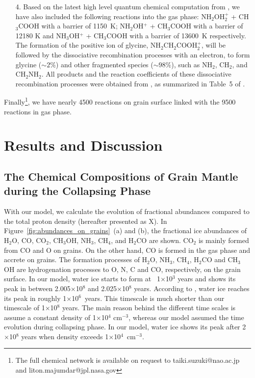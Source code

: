 \documentclass{aastex61}
\begin{document}
\begin{itemize}
\item [4.] Based on the latest high level quantum chemical computation from \cite{Barrientos12}, we have also included the following reactions into the gas phase: NH$_2$OH$_2^+$ + CH$_3$COOH with a barrier of 1150~K; NH$_2$OH$^+$ + CH$_3$COOH with a barrier of 12180 K and NH$_3$OH$^+$ + CH$_3$COOH with a barrier of 13600~K respectively.  
%
The formation of the positive ion of glycine, NH$_2$CH$_2$COOH$_2^+$, will be followed by the dissociative recombination processes with an electron, to form glycine ($\sim2\%$) and other fragmented species ($\sim98\%$), such as NH$_2$, CH$_2$, and CH$_2$NH$_2$.
%
All products and the reaction coefficients of these dissociative recombination processes were obtained from \cite{Garrod13}, as summarized in Table~5 of \cite{Garrod13}.
\end{itemize}

Finally\footnote{The full chemical network is available on request to taiki.suzuki@nao.ac.jp and liton.majumdar@jpl.nasa.gov}, we have nearly 4500 reactions on grain surface linked with the 9500 reactions in gas phase. 


\section{Results and Discussion}
\subsection{The Chemical Compositions of Grain Mantle during the Collapsing Phase}
With our model, we calculate the evolution of fractional abundances compared to the total proton density (hereafter presented as X).
%
In Figure~\ref{fig:abundances_on_grains}~(a) and (b), the fractional ice abundances of H$_2$O, CO, CO$_2$, CH$_3$OH, NH$_3$, CH$_4$, and H$_2$CO are shown.
%
CO$_2$  is mainly formed from CO and O on grains.
%
On the other hand, CO is formed in the gas phase and accrete on grains.
%
The formation processes of H$_2$O, NH$_3$, CH$_4$, H$_2$CO and CH$_3$OH are hydrogenation processes to O, N, C and CO, respectively, on the grain surface.
%
In our model, water ice starts to form at ~1$\times$10$^3$ years and shows its peak in between 2.005$\times$10$^8$ and 2.025$\times$10$^8$ years.
%
According to \cite{Ruaud16}, water ice reaches its peak in roughly 1$\times$10$^6$~years. 
%
This timescale is much shorter than our timescale of 1$\times$10$^8$ years. 
%
The main reason behind the different time scales is \cite{Ruaud16} assume a constant density of 1$\times$10$^4$ cm$^{-3}$, whereas our model assumed the time evolution during collapsing phase.
%
In our model, water ice shows its peak after 2$\times$10$^8$ years when density exceeds 1$\times$10$^4$~cm$^{-3}$.
%
\end{document}
